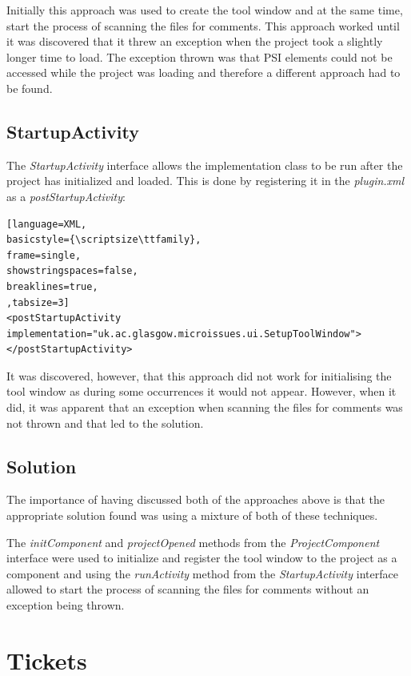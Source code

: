 \documentclass{4thYearProject}
\begin{document}
Initially this approach was used to create the tool window and at the same time, start the process of scanning the files for comments. This approach worked until it was discovered that it threw an exception when the project took a slightly longer time to load. The exception thrown was that PSI elements could not be accessed while the project was loading and therefore a different approach had to be found. 

\subsection{StartupActivity}

The \textit{StartupActivity} interface allows the implementation class to be run after the project has initialized and loaded. This is done by registering it in the \textit{plugin.xml} as a \textit{postStartupActivity}:   \\

\begin{lstlisting}[language=XML, 
basicstyle={\scriptsize\ttfamily}, 
frame=single,
showstringspaces=false,
breaklines=true,
,tabsize=3]
<postStartupActivity implementation="uk.ac.glasgow.microissues.ui.SetupToolWindow"></postStartupActivity>
\end{lstlisting}

It was discovered, however, that this approach did not work for initialising the tool window as during some occurrences it would not appear. However, when it did, it was apparent that an exception when scanning the files for comments was not thrown and that led to the solution.

\subsection{Solution}

The importance of having discussed both of the approaches above is that the appropriate solution found was using a mixture of both of these techniques. 

The \textit{initComponent} and \textit{projectOpened} methods from the \textit{ProjectComponent} interface were used to initialize and register the tool window to the project as a component and using the \textit{runActivity} method from the \textit{StartupActivity} interface allowed to start the process of scanning the files for comments without an exception being thrown.

\section{Tickets}
\end{document}
